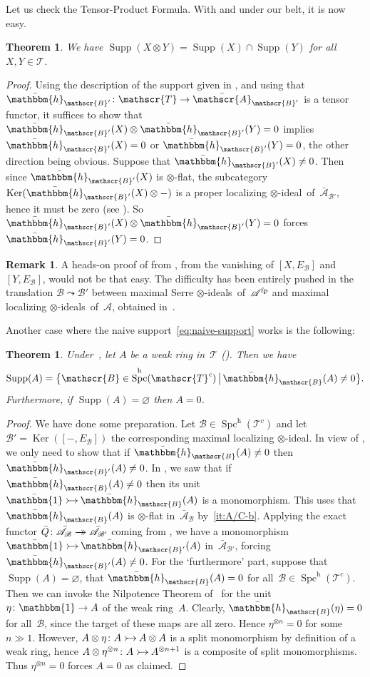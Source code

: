 \documentclass[JEP,XML,SOM,Unicode]{cedram}
\makeatletter
\newcommand{\onto}{\mathchoice{\to\hspace*{-5mm}\to}{\to\hspace*{-2.85mm}\to}{\to\hspace*{-3mm}\to}{\to\hspace*{-3mm}\to}}
\newcommand{\into}{\mathchoice{\xymatrix@=.5cm{\ar@{>->}[r]&}}
{\xymatrix@=.3cm{\ar@{>->}[r]&}\hspace*{-1mm}}
{\hspace*{-1mm}\xymatrix@=.25cm{\ar@{>->}[r]&}\hspace*{-1.5mm}}
{\xymatrix@=.1cm{\ar@{>->}[r]&}\hspace*{-1mm}}
}
\numberwithin{equation}{section}
\newtheorem{Thm}[equation]{Theorem}
\theoremstyle{definition}
\newtheorem{Rem}[equation]{Remark}
\DeclareMathOperator{\Ker}{Ker}
\DeclareMathOperator{\Spc}{Spc}
\newcommand{\cat}[1]{\mathscr{#1}}
\newcommand{\SET}[2]{\big\{#1\,\big|\,#2\big\}}
\newcommand{\unit}{\mathbbm{1}}
\newcommand{\smallh}{\mathrm{h}}
\DeclareMathOperator{\Supp}{Supp}
\newcommand{\ABp}{\bar{\cA}_{\cB'}}
\newcommand{\AB}{\bar{\cA}_{\cB}}
\newcommand{\boneda}{\bar\yoneda}
\newcommand{\bunit}{\bar\unit}
\newcommand{\cA}{\cat{A}}
\newcommand{\cB}{\cat{B}}
\newcommand{\cT}{\cat{T}}
\newcommand{\EB}{E_{\cB}}
\newcommand{\fp}{^{\textup{fp}}}
\newcommand{\hBp}{\boneda_{\cB'}}
\newcommand{\hB}{\boneda_{\cB}}
\newcommand{\potimes}[1]{^{\otimes #1}}
\newcommand{\SpchT}{\Spch(\cat{T}^c)}
\newcommand{\Spch}{\Spc^{\smallh}}
\newcommand{\tensids}{$\otimes$\nobreakdash-ideals}
\newcommand{\tensid}{$\otimes$\nobreakdash-ideal}
\newcommand{\yoneda}{\mathbbm{h}}
\makeatother
\begin{document}
Let us check the Tensor-Product Formula. With  and  under our belt, it is now easy.
\begin{Thm}
\label{Thm:TPF}
We have $\Supp(X\otimes Y)=\Supp(X)\cap\Supp(Y)$ for all $X,Y\in \cat{T}$.
\end{Thm}

\begin{proof}
Using the description of the support given in , and using that $\hBp\colon \cT\to \ABp$ is a tensor functor, it suffices to show that $\hBp(X)\otimes \hBp(Y)=0$ implies $\hBp(X)=0$ or $\hBp(Y)=0$, the other direction being obvious. Suppose that $\hBp(X)\neq 0$. Then since $\hBp(X)$ is $\otimes$-flat, the subcategory $\Ker(\hBp(X)\otimes-)$ is a proper localizing \tensid\ of~$\ABp$, hence it must be zero (see ). So~$\hBp(X)\otimes \hBp(Y)=0$ forces $\hBp(Y)=0$.
\end{proof}

\begin{Rem}
A heads-on proof of  from , \ie from the vanishing of $[X,\EB]$ and $[Y,\EB]$, would not be that easy. The difficulty has been entirely pushed in the translation $\cB\leadsto\cB'$ between maximal Serre \tensids\ of~$\cA\fp$ and maximal localizing \tensids\ of~$\cA$, obtained in~.
\end{Rem}

Another case where the naive support~\eqref{eq:naive-support} works is the following:

\begin{Thm}
\label{Thm:rings}
Under~, let $A$ be a weak ring in~$\cT$ (). Then we have
\[
\Supp(A)=\SET{\cB\in\SpchT}{\hB(A)\neq 0}.
\]
Furthermore, if $\Supp(A)=\varnothing$ then $A=0$.
\end{Thm}

\begin{proof}
We have done some preparation. Let $\cB\!\in\!\SpchT$ and let ${\cB'}\!=\!\Ker([-,\EB])$ the corresponding maximal localizing \tensid. In view of , we only need to show that if $\hB(A)\neq0$ then $\hBp(A)\neq0$. In , we saw that if $\hB(A)\neq0$ then its unit $\bunit\into \hB(A)$ is a monomorphism. This uses that $\hB(A)$ is $\otimes$-flat in~$\AB$ by \,\eqref{it:A/C-b}. Applying the exact functor $\bar Q\colon \AB\onto \ABp$ coming from , we have a monomorphism $\bunit\into \hBp(A)$ in~$\ABp$, forcing~$\hBp(A)\neq0$. For the `furthermore' part, suppose that $\Supp(A)=\varnothing$, \ie that $\hB(A)=0$ for all~$\cB\in\SpchT$. Then we can invoke the Nilpotence Theorem of~\cite{Balmer20a} for the unit $\eta\colon\unit\to A$ of the weak ring~$A$. Clearly, $\hB(\eta)=0$ for all~$\cB$, since the target of these maps are all zero. Hence $\eta\potimes{n}=0$ for some $n\gg1$. However, $A\otimes\eta\colon A\into A\otimes A$ is a split monomorphism by definition of a weak ring, hence $A\otimes\eta\potimes{n}\colon A\into A\potimes{n+1}$ is a composite of split monomorphisms. Thus $\eta\potimes{n}=0$ forces $A=0$ as claimed.
\end{proof}
\end{document}
